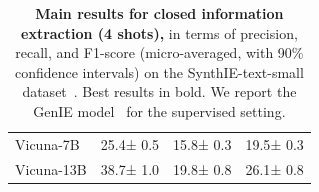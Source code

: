 \begin{table}[tb]
{\begin{tabular}{@{}lccc@{}}
\hspace{4mm} Vicuna-7B    &      25.4{\scriptsize± 0.5}  &    15.8{\scriptsize± 0.3}       &    19.5{\scriptsize± 0.3}   \\
\hspace{4mm} Vicuna-13B     &    38.7{\scriptsize± 1.0}    &    19.8{\scriptsize± 0.8}     &    26.1{\scriptsize± 0.8}   \\
\bottomrule
\end{tabular}
}
\caption{\textbf{Main results for closed information extraction (4 shots),} in terms of precision, recall, and F1-score (micro-averaged, with 90\% confidence intervals) on the SynthIE-text-small dataset~\cite{josifoski2023exploiting}. Best results in bold.
We report the GenIE model~\cite{josifoski-etal-2022-genie} for the supervised setting.}
\label{tab:InformationExtractionResults}
\end{table}